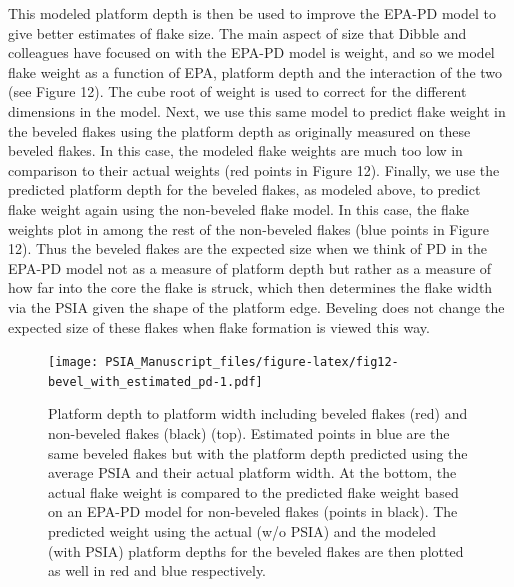 \documentclass[10pt,letterpaper]{article}
\begin{document}
This modeled platform depth is then be used to improve the EPA-PD model
to give better estimates of flake size. The main aspect of size that
Dibble and colleagues have focused on with the EPA-PD model is weight,
and so we model flake weight as a function of EPA, platform depth and
the interaction of the two (see Figure 12). The cube root of weight is
used to correct for the different dimensions in the model. Next, we use
this same model to predict flake weight in the beveled flakes using the
platform depth as originally measured on these beveled flakes. In this
case, the modeled flake weights are much too low in comparison to their
actual weights (red points in Figure 12). Finally, we use the predicted
platform depth for the beveled flakes, as modeled above, to predict
flake weight again using the non-beveled flake model. In this case, the
flake weights plot in among the rest of the non-beveled flakes (blue
points in Figure 12). Thus the beveled flakes are the expected size when
we think of PD in the EPA-PD model not as a measure of platform depth
but rather as a measure of how far into the core the flake is struck,
which then determines the flake width via the PSIA given the shape of
the platform edge. Beveling does not change the expected size of these
flakes when flake formation is viewed this way.

\begin{figure}
\centering
\texttt{[image: PSIA\_Manuscript\_files/figure-latex/fig12-bevel\_with\_estimated\_pd-1.pdf]}
\caption{Platform depth to platform width including beveled flakes (red)
and non-beveled flakes (black) (top). Estimated points in blue are the
same beveled flakes but with the platform depth predicted using the
average PSIA and their actual platform width. At the bottom, the actual
flake weight is compared to the predicted flake weight based on an
EPA-PD model for non-beveled flakes (points in black). The predicted
weight using the actual (w/o PSIA) and the modeled (with PSIA) platform
depths for the beveled flakes are then plotted as well in red and blue
respectively.}
\end{figure}
\end{document}
